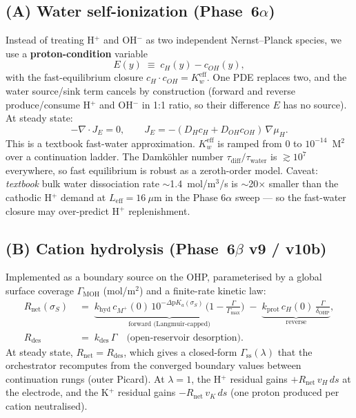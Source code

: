 \documentclass[11pt]{article}
\begin{document}
\subsection{(A) Water self-ionization (Phase~6$\alpha$)}

Instead of treating H$^+$ and OH$^-$ as two independent
Nernst--Planck species, we use a \textbf{proton-condition} variable
\[
  E(y) \;\equiv\; c_H(y) - c_{OH}(y),
\]
with the fast-equilibrium closure
$c_H \cdot c_{OH} = K_w^{\mathrm{eff}}$.  One PDE replaces two, and
the water source/sink term cancels by construction (forward and
reverse produce/consume H$^+$ and OH$^-$ in 1:1 ratio, so their
difference $E$ has no source).  At steady state:
\[
  -\nabla \cdot J_E = 0,
  \qquad
  J_E = -(D_H c_H + D_{OH} c_{OH})\,\nabla \mu_H.
\]
This is a textbook fast-water approximation.  $K_w^{\mathrm{eff}}$ is
ramped from $0$ to $10^{-14}$~M$^2$ over a continuation ladder.  The
Damk\"ohler number $\tau_{\mathrm{diff}}/\tau_{\mathrm{water}}$ is
$\gtrsim 10^7$ everywhere, so fast equilibrium is robust as a
zeroth-order model.  Caveat: \emph{textbook} bulk water dissociation
rate $\sim$1.4~mol/m$^3$/s is $\sim$20$\times$ smaller than the
cathodic H$^+$ demand at $L_{\mathrm{eff}}=16~\mu$m in the Phase 6$\alpha$
sweep --- so the fast-water closure may over-predict H$^+$ replenishment.

\subsection{(B) Cation hydrolysis (Phase~6$\beta$ v9 / v10b)}

Implemented as a boundary source on the OHP, parameterised by a
global surface coverage $\Gamma_{\mathrm{MOH}}$ (mol/m$^2$) and a
finite-rate kinetic law:
\begin{align}
R_{\mathrm{net}}(\sigma_S) &\;=\;
  \underbrace{k_{\mathrm{hyd}}\,c_{M^+}(0)\,10^{-\Delta\mathrm{p}K_a(\sigma_S)}\,
   \Big(1-\tfrac{\Gamma}{\Gamma_{\max}}\Big)}_{\text{forward (Langmuir-capped)}}
   \;-\;
  \underbrace{k_{\mathrm{prot}}\,c_H(0)\,\tfrac{\Gamma}{\delta_{\mathrm{OHP}}}}_{\text{reverse}},
\label{eq:rnet}\\
R_{\mathrm{des}} &\;=\; k_{\mathrm{des}}\,\Gamma\quad\text{(open-reservoir desorption)}.
\end{align}
At steady state, $R_{\mathrm{net}}=R_{\mathrm{des}}$, which gives a
closed-form $\Gamma_{\mathrm{ss}}(\lambda)$ that the orchestrator
recomputes from the converged boundary values between continuation
rungs (outer Picard).  At $\lambda=1$, the H$^+$ residual gains
$+R_{\mathrm{net}}\,v_H\,ds$ at the electrode, and the K$^+$
residual gains $-R_{\mathrm{net}}\,v_K\,ds$ (one proton produced per
cation neutralised).
\end{document}
